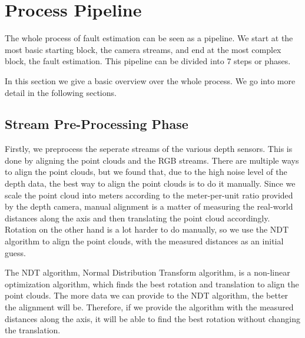\section{Process Pipeline}

The whole process of fault estimation can be seen as a pipeline. We start at the most basic starting block, the camera streams, and end at the most complex block, the fault estimation. %
This pipeline can be divided into 7 steps or phases.

In this section we give a basic overview over the whole process. We go into more detail in the following sections.


\subsection{Stream Pre-Processing Phase}

Firstly, we preprocess the seperate streams of the various depth sensors. This is done by aligning the point clouds and the RGB streams. There are multiple ways to align the point clouds, but we found that, due to the high noise level of the depth data, the best way to align the point clouds is to do it manually. Since we scale the point cloud into meters according to the meter-per-unit ratio provided by the depth camera, manual alignment is a matter of measuring the real-world distances along the axis and then translating the point cloud accordingly. Rotation on the other hand is a lot harder to do manually, so we use the NDT algorithm to align the point clouds, with the measured distances as an initial guess. 

The NDT algorithm, Normal Distribution Transform algorithm, is a non-linear optimization algorithm, which finds the best rotation and translation to align the point clouds\cite{NDT}. The more data we can provide to the NDT algorithm, the better the alignment will be. Therefore, if we provide the algorithm with the measured distances along the axis, it will be able to find the best rotation without changing the translation.

